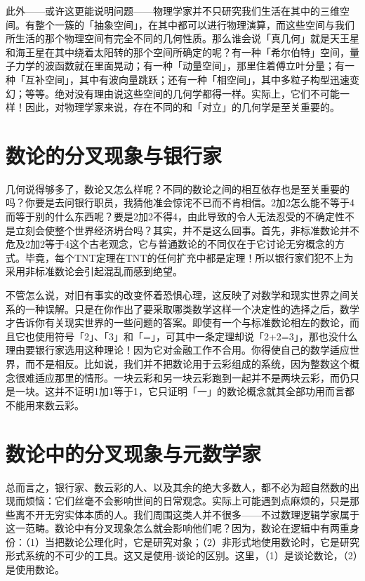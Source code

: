 \documentclass[
  12pt,
  twoside,
  openright,
  oldfontcommands,
]{memoir}
\begin{document}
此外------或许这更能说明问题------物理学家并不只研究我们生活在其中的三维空间。有整个一簇的「抽象空间」，在其中都可以进行物理演算，而这些空间与我们所生活的那个物理空间有完全不同的几何性质。那么谁会说「真几何」就是天王星和海王星在其中绕着太阳转的那个空间所确定的呢？有一种「希尔伯特」空间，量子力学的波函数就在里面晃动；有一种「动量空间」，那里住着傅立叶分量；有一种「互补空间」，其中有波向量跳跃；还有一种「相空间」，其中多粒子构型迅速变幻；等等。绝对没有理由说这些空间的几何学都得一样。实际上，它们不可能一样！因此，对物理学家来说，存在不同的和「对立」的几何学是至关重要的。

\section{数论的分叉现象与银行家}

几何说得够多了，数论又怎么样呢？不同的数论之间的相互依存也是至关重要的吗？你要是去问银行职员，我猜他准会惊诧不已而不肯相信。2加2怎么能不等于4而等于别的什么东西呢？要是2加2不得4，由此导致的令人无法忍受的不确定性不是立刻会使整个世界经济坍台吗？其实，并不是这么回事。首先，非标准数论并不危及2加2等于4这个古老观念，它与普通数论的不同仅在于它讨论无穷概念的方式。毕竟，每个TNT定理在TNT的任何扩充中都是定理！所以银行家们犯不上为采用非标准数论会引起混乱而感到绝望。

不管怎么说，对旧有事实的改变怀着恐惧心理，这反映了对数学和现实世界之间关系的一种误解。只是在你作出了要采取哪类数学这样一个决定性的选择之后，数学才告诉你有关现实世界的一些问题的答案。即使有一个与标准数论相左的数论，而且它也使用符号「2」、「3」和「=」，可其中一条定理却说「2+2=3」，那也没什么理由要银行家选用这种理论！因为它对金融工作不合用。你得使自己的数学适应世界，而不是相反。比如说，我们并不把数论用于云彩组成的系统，因为整数这个概念很难适应那里的情形。一块云彩和另一块云彩跑到一起并不是两块云彩，而仍只是一块。这并不证明1加1等于1，它只证明「一」的数论概念就其全部功用而言都不能用来数云彩。

\section{数论中的分叉现象与元数学家}

总而言之，银行家、数云彩的人、以及其余的绝大多数人，都不必为超自然数的出现而烦恼：它们丝毫不会影响世间的日常观念。实际上可能遇到点麻烦的，只是那些离不开无穷实体本质的人。我们周围这类人并不很多------不过数理逻辑学家属于这一范畴。数论中有分叉现象怎么就会影响他们呢？因为，数论在逻辑中有两重身份：（1）当把数论公理化时，它是研究对象；（2）非形式地使用数论时，它是研究形式系统的不可少的工具。这又是使用-谈论的区别。这里，（1）是谈论数论，（2）是使用数论。
\end{document}
